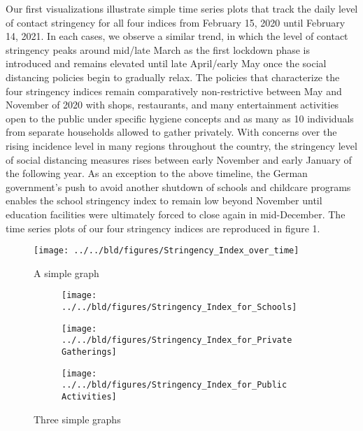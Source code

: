Our first visualizations illustrate simple time series plots that track the daily level of contact stringency for all four indices from February 15, 2020 until February 14, 2021. In each cases, we observe a similar trend, in which the level of contact stringency peaks around mid/late March as the first lockdown phase is introduced and remains elevated until late April/early May once the social distancing policies begin to gradually relax. The policies that characterize the four stringency indices remain comparatively non-restrictive between May and November of 2020 with shops, restaurants, and many entertainment activities open to the public under specific hygiene concepts and as many as 10 individuals from separate households allowed to gather privately. With concerns over the rising incidence level in many regions throughout the country, the stringency level of social distancing measures rises between early November and early January of the following year. As an exception to the above timeline, the German government’s push to avoid another shutdown of schools and childcare programs enables the school stringency index to remain low beyond November until education facilities were ultimately forced to close again in mid-December. The time series plots of our four stringency indices are reproduced in figure 1.

\begin{figure}[H]
      \centering
      \texttt{[image: ../../bld/figures/Stringency\_Index\_over\_time]}
      \label{fig:five over x}
      \caption{A simple graph}
      \label{fig:simplegraph}
\end{figure}

\begin{figure}[p]
     \centering
     \begin{subfigure}[b]{0.72\textwidth}
         \centering
         \texttt{[image: ../../bld/figures/Stringency\_Index\_for\_Schools]}
         \caption{}
         \label{fig:y equals x}
     \end{subfigure}
     \hfill
     \begin{subfigure}[b]{0.72\textwidth}
         \centering
         \texttt{[image: ../../bld/figures/Stringency\_Index\_for\_Private Gatherings]}
         \caption{}
         \label{fig:three sin x}
     \end{subfigure}
     \hfill
     \begin{subfigure}[b]{0.72\textwidth}
         \centering
         \texttt{[image: ../../bld/figures/Stringency\_Index\_for\_Public Activities]}
         \caption{}
         \label{fig:five over x}
     \end{subfigure}
        \caption{Three simple graphs}
        \label{fig:four graphs}
\end{figure}

